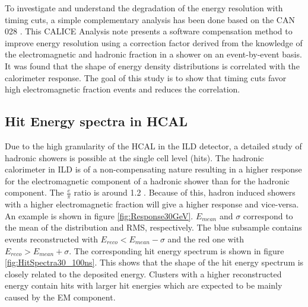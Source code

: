 To investigate and understand the degradation of the energy resolution with timing cuts, a simple complementary analysis has been done based on the CAN 028 \cite{CaN028}. This CALICE Analysis note presents a software compensation method to improve energy resolution using a correction factor derived from the knowledge of the electromagnetic and hadronic fraction in a shower on an event-by-event basis. It was found that the shape of energy density distributions is correlated with the calorimeter response. The goal of this study is to show that timing cuts favor high electromagnetic fraction events and reduces the correlation.

\subsection{Hit Energy spectra in HCAL}

Due to the high granularity of the HCAL in the ILD detector, a detailed study of hadronic showers is possible at the single cell level (hits). The hadronic calorimeter in ILD is of a non-compensating nature resulting in a higher response for the electromagnetic component of a hadronic shower than for the hadronic component. The $\frac{e}{\pi}$ ratio is around 1.2 \cite{ILC_TDR_Vol4}. Because of this, hadron induced showers with a higher electromagnetic fraction will give a higher response and vice-versa. An example is shown in figure \ref{fig:Response30GeV}. $E_{mean}$ and $\sigma$ correspond to the mean of the distribution and RMS, respectively. The blue subsample contains events reconstructed with $E_{reco} < E_{mean} - \sigma$ and the red one with $E_{reco} > E_{mean} + \sigma$. The corresponding hit energy spectrum is shown in figure \ref{fig:HitSpectra30_100ns}. This shows that the shape of the hit energy spectrum is closely related to the deposited energy. Clusters with a higher reconstructed energy contain hits with larger hit energies which are expected to be mainly caused by the EM component.

